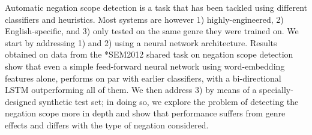 Automatic negation scope detection is a task that has been tackled using different classifiers and heuristics. Most systems are however 1) highly-engineered, 2) English-specific, and 3) only tested on the same genre they were trained on. We start by addressing 1) and 2) using a neural network architecture. Results obtained on data from the *SEM2012 shared task on negation scope detection show that even a simple feed-forward neural network using word-embedding features alone, performs on par with earlier classifiers, with a bi-directional LSTM outperforming all of them. We then address 3) by means of a specially-designed synthetic test set; in doing so, we explore the problem of detecting the negation scope more in depth and show that performance suffers from genre effects and differs with the type of negation considered.
